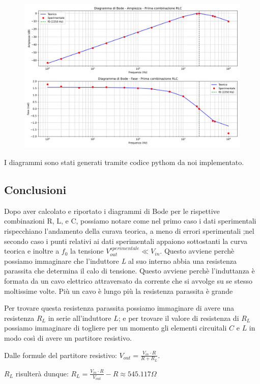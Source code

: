 \documentclass{article}
\begin{document}
 
\begin{figure}[H]
    \centering
    \includegraphics[width=0.8\linewidth]{figures/diagramma_bode_1.png}
\end{figure}
\noindent

I diagrammi sono stati generati tramite codice pythom da noi implementato.

\subsection{Conclusioni}
Dopo aver calcolato e riportato i diagrammi di Bode per le rispettive combinazioni R, L, e C, possiamo notare come nel primo caso i dati sperimentali rispecchiano l'andamento della curava teorica, a meno di errori sperimentali ;nel secondo caso i punti relativi ai dati sperimentali appaiono sottostanti la curva teorica e inoltre a $f_0$ la tensione $V_{out}^{sperimentale} \ll V_{in}$. Questo avviene perchè possiamo immaginare che l'induttore \textit{L} al suo interno abbia una resistenza parassita che determina il calo di tensione. 
Questo avviene perchè l’induttanza è formata da un cavo elettrico attraversato da corrente che si avvolge su se stesso moltissime volte. Più un cavo è lungo più la resistenza parassita è grande

Per trovare questa resistenza parassita possiamo immaginare di avere una resistenza $R_L$ in serie all'induttore $L$; e per trovare il valore di resistenza di $R_L$ possiamo immaginare di togliere per un momento gli elementi circuitali $C$ e $L$ in modo così di avere un partitore resistivo.

Dalle formule del partitore resistivo: \(V_{out} = \frac{V_{in} \cdot R}{R + R_L}\).

$R_L$ risulterà dunque: \(R_L = \frac{V_{in} \cdot R }{V_{out}} - R \approx 545.117 \Omega \)
\end{document}
